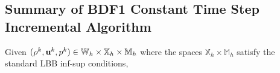 \documentclass[letterpaper]{erdc}
\begin{document}
%


%
%
\subsection{Summary of BDF1 Constant Time Step Incremental Algorithm}\label{subsec:BDF1constantTimeSummary}
Given $(\rho^{k}, \textbf{u}^{k}, p^{k})\in \mathbb{W}_h\times \mathbb{X}_h\times \mathbb{M}_h$ where the spaces $\mathbb{X}_h\times \mathbb{M}_h$ satisfy the standard LBB inf-sup conditions, 
\end{document}
